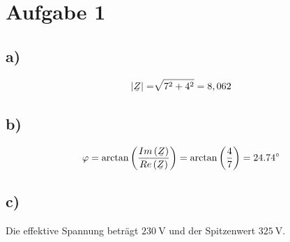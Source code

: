 \documentclass[../../document.tex]{subfiles}
\begin{document}
\section*{Aufgabe 1}

\subsection*{a)}

\begin{equation*}
    \begin{split}
        \left\vert\ubar{Z}\right\vert &= \sqrt[]{7^2 + 4^2} = 8,062\\
    \end{split}
\end{equation*}

\subsection*{b)}

\begin{equation*}
    \begin{split}
        \varphi &= \arctan\left(\frac{Im\left(\ubar{Z}\right)}{Re\left(\ubar{Z}\right)}\right) = \arctan\left(\frac{4}{7}\right) = \SI{24,74}{\degree}\\
    \end{split}
\end{equation*}

\subsection*{c)}

Die effektive Spannung beträgt $\SI{230}{\volt}$ und der Spitzenwert $\SI{325}{\volt}$.
\end{document}

